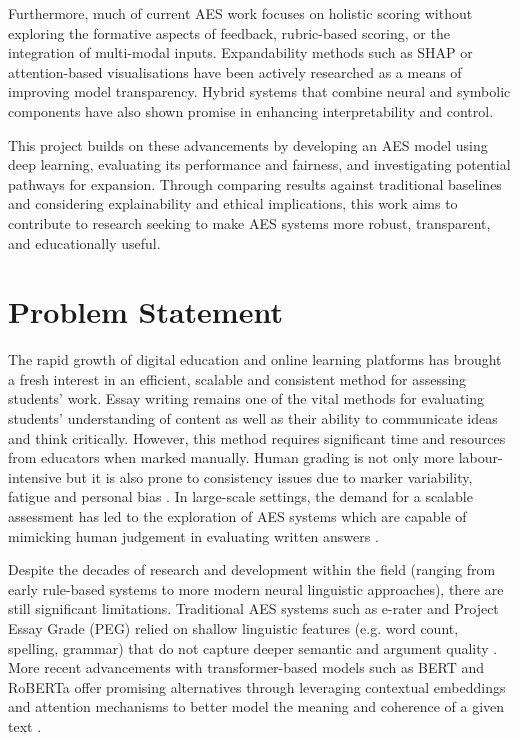 \documentclass[12pt,a4paper]{report}
\begin{document}
Furthermore, much of current AES work focuses on holistic scoring without exploring the formative aspects of feedback, rubric-based scoring, or the integration of multi-modal inputs. Expandability methods such as SHAP \citep{lundberg2017unified} or attention-based visualisations have been actively researched as a means of improving model transparency. Hybrid systems that combine neural and symbolic components have also shown promise in enhancing interpretability and control.

This project builds on these advancements by developing an AES model using deep learning, evaluating its performance and fairness, and investigating potential pathways for expansion. Through comparing 
results against traditional baselines and considering explainability and ethical implications, this work aims to contribute to research seeking to make AES systems more robust, transparent, and educationally useful.

\section{Problem Statement}
The rapid growth of digital education and online learning platforms has brought a fresh interest in an efficient, scalable and consistent method for assessing students' work. Essay writing remains one of the vital methods for evaluating students' understanding of content as well as their ability to communicate ideas and think critically. However, this method requires significant time and resources from educators when marked manually. Human grading is not only more labour-intensive but it is also prone to consistency issues due to marker variability, fatigue and personal bias \citep{page2003}. In large-scale settings, the demand for a scalable assessment has led to the exploration of AES systems which are capable of mimicking human judgement in evaluating written answers \citep{burstein2003criterion}.

Despite the decades of research and development within the field (ranging from early rule-based systems to more modern neural linguistic approaches), there are still significant limitations\citep{dikli2006}. Traditional AES systems such as e-rater \citep{e-rater2006} and Project Essay Grade (PEG) \citep{page2003} relied on shallow linguistic features (e.g. word count, spelling, grammar) that do not capture deeper semantic and argument quality \citep{dikli2006}. More recent advancements with transformer-based models such as BERT \citep{devlin2019bert} and RoBERTa \citep{liu2019roberta} offer promising alternatives through leveraging contextual embeddings and attention mechanisms to better model the meaning and coherence of a given text \citep{devlin2019bert}. 
\end{document}
